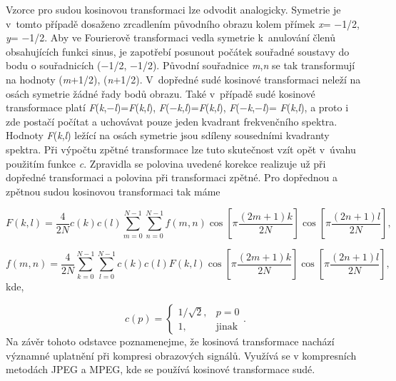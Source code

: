 Vzorce pro sudou kosinovou transformaci lze odvodit analogicky. Symetrie je v~tomto případě  dosaženo zrcadlením původního obrazu kolem přímek \textit{x}= $-$1/2, \textit{y}= $-$1/2. Aby ve Fourierově transformaci vedla symetrie k~anulování členů obsahujících funkci sinus, je zapotřebí posunout počátek souřadné soustavy do bodu o souřadnicích ($-$1/2, $-$1/2). Původní souřadnice \textit{m},\textit{n} se tak transformují na hodnoty (\textit{m}+1/2), (\textit{n}+1/2). V~dopředné sudé kosinové transformaci neleží na osách symetrie žádné řady bodů obrazu. Také v~případě sudé kosinové transformace platí \textit{F}(\textit{k},$-$\textit{l})=\textit{F}(\textit{k},\textit{l}), \textit{F}($-$\textit{k},\textit{l})=\textit{F}(\textit{k},\textit{l}), \textit{F}($-$\textit{k},$-$\textit{l})= \textit{F}(\textit{k},\textit{l}), a proto i zde postačí počítat a uchovávat pouze jeden kvadrant frekvenčního spektra. Hodnoty \textit{F}(\textit{k},\textit{l}) ležící na osách symetrie jsou sdíleny sousedními kvadranty spektra. Při výpočtu zpětné transformace lze tuto skutečnost vzít opět v~úvahu použitím funkce \textit{c}. Zpravidla se polovina uvedené korekce realizuje už při dopředné transformaci a polovina při transformaci zpětné. Pro dopřednou a zpětnou sudou kosinovou transformaci tak máme 

\begin{equation} \label{eq:2_81} 
    F(k, l) = \frac{4}{2N} c(k)c(l) \sum\limits_{m=0}^{N-1} \sum\limits_{n=0}^{N-1} f(m, n) \cos \left[ \pi \frac{(2m +1)k}{2N} \right] \cos \left[ \pi \frac{(2n + 1)l}{2N}\right],
\end{equation} 

\begin{equation} \label{eq:2_82}
    f(m, n) = \frac{4}{2N} \sum\limits_{k=0}^{N-1} \sum\limits_{l=0}^{N-1} c(k) c(l) F(k, l) \cos \left[ \pi \frac{(2m +1)k}{2N} \right] \cos \left[ \pi \frac{(2n + 1)l}{2N}\right],
\end{equation} 
kde,

\begin{equation} \label{eq:2_83} 
    c(p) = \left\{
    \begin{array}{cc}
    1/\sqrt{2}, & p = 0 \\
    1, & \mathrm{jinak}
    \end{array}
    \right. .  
\end{equation} 
Na závěr tohoto odstavce poznamenejme, že kosinová transformace nachází významné uplatnění při kompresi obrazových signálů. Využívá se v kompresních metodách JPEG a MPEG, kde se používá kosinové transformace sudé.

